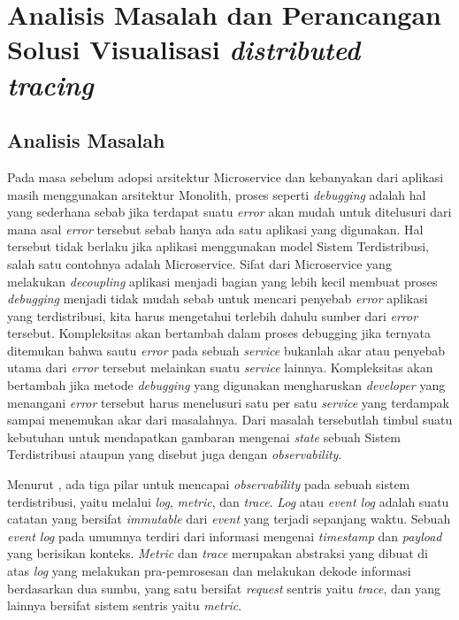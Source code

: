 \chapter{Analisis Masalah dan Perancangan Solusi Visualisasi \textit{distributed tracing}}



\section{Analisis Masalah}

 Pada masa sebelum adopsi arsitektur Microservice dan kebanyakan dari aplikasi masih menggunakan arsitektur Monolith, proses seperti \textit{debugging} adalah hal yang sederhana sebab jika terdapat suatu \textit{error} akan mudah untuk ditelusuri dari mana asal \textit{error} tersebut sebab hanya ada satu aplikasi yang digunakan. Hal tersebut tidak berlaku jika aplikasi menggunakan model Sistem Terdistribusi, salah satu contohnya adalah Microservice. Sifat dari Microservice yang melakukan \textit{decoupling} aplikasi menjadi bagian yang lebih kecil membuat proses \textit{debugging} menjadi tidak mudah sebab untuk mencari penyebab \textit{error} aplikasi yang terdistribusi, kita harus mengetahui terlebih dahulu sumber dari \textit{error} tersebut. Kompleksitas akan bertambah dalam proses debugging jika ternyata ditemukan bahwa sautu \textit{error} pada sebuah \textit{service} bukanlah akar atau penyebab utama dari \textit{error} tersebut melainkan suatu \textit{service} lainnya. Kompleksitas akan bertambah jika metode \textit{debugging} yang digunakan mengharuskan \textit{developer} yang menangani \textit{error} tersebut harus menelusuri satu per satu \textit{service} yang terdampak sampai menemukan akar dari masalahnya. Dari masalah tersebutlah timbul suatu kebutuhan untuk mendapatkan gambaran mengenai \textit{state} sebuah Sistem Terdistribusi ataupun yang disebut juga dengan \textit{observability}.
 
 Menurut \citep{sridharan2018distributed}, ada tiga pilar untuk mencapai \textit{observability} pada sebuah sistem terdistribusi, yaitu melalui \textit{log}, \textit{metric}, dan \textit{trace}. \textit{Log} atau \textit{event log} adalah suatu catatan yang bersifat \textit{immutable} dari \textit{event} yang terjadi sepanjang waktu. Sebuah \textit{event log} pada umumnya terdiri dari informasi mengenai \textit{timestamp} dan \textit{payload} yang berisikan konteks. \textit{Metric} dan \textit{trace} merupakan abstraksi yang dibuat di atas \textit{log} yang melakukan pra-pemrosesan dan melakukan dekode informasi berdasarkan dua sumbu, yang satu bersifat \textit{request} sentris yaitu \textit{trace}, dan yang lainnya bersifat sistem sentris yaitu \textit{metric}.
 
